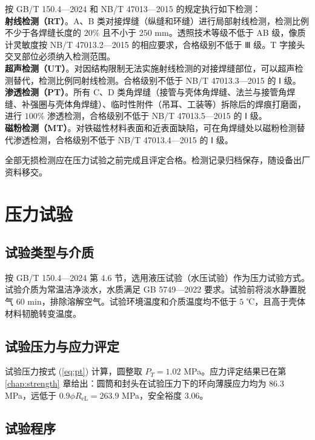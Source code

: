 按 GB/T 150.4—2024 和 NB/T 47013—2015\cite{gbt150-2024,nbt47013-2015} 的规定执行如下检测：\\[4pt]
\textbf{射线检测（RT）}。A、B 类对接焊缝（纵缝和环缝）进行局部射线检测，检测比例不少于各焊缝长度的 $20\%$ 且不小于 $250$ mm。透照技术等级不低于 AB 级，像质计灵敏度按 NB/T 47013.2—2015 的相应要求，合格级别不低于 Ⅲ 级。T 字接头交叉部位必须纳入检测范围。\\[4pt]
\textbf{超声检测（UT）}。对因结构限制无法实施射线检测的对接焊缝部位，可以超声检测替代，检测比例同射线检测。合格级别不低于 NB/T 47013.3—2015 的 Ⅰ 级。\\[4pt]
\textbf{渗透检测（PT）}。所有 C、D 类角焊缝（接管与壳体角焊缝、法兰与接管角焊缝、补强圈与壳体角焊缝）、临时性附件（吊耳、工装等）拆除后的焊痕打磨面，进行 $100\%$ 渗透检测，合格级别不低于 NB/T 47013.5—2015 的 Ⅰ 级。\\[4pt]
\textbf{磁粉检测（MT）}。对铁磁性材料表面和近表面缺陷，可在角焊缝处以磁粉检测替代渗透检测，合格级别不低于 NB/T 47013.4—2015 的 Ⅰ 级。

全部无损检测应在压力试验之前完成且评定合格。检测记录归档保存，随设备出厂资料移交。

\section{压力试验}

\subsection{试验类型与介质}

按 GB/T 150.4—2024 第 4.6 节\cite{gbt150-2024}，选用液压试验（水压试验）作为压力试验方式。试验介质为常温洁净淡水，水质满足 GB 5749—2022 要求\cite{gb5749-2022}。试验前将淡水静置脱气 $60$ min，排除溶解空气。试验环境温度和介质温度均不低于 $5$ ℃，且高于壳体材料韧脆转变温度。

\subsection{试验压力与应力评定}

试验压力按式 (\ref{eq:pt}) 计算，圆整取 $P_T = 1.02$ MPa。应力评定结果已在第 \ref{chap:strength} 章给出：圆筒和封头在试验压力下的环向薄膜应力均为 $86.3$ MPa，远低于 $0.9\phi R_{\text{eL}} = 263.9$ MPa，安全裕度 $3.06$。

\subsection{试验程序}

